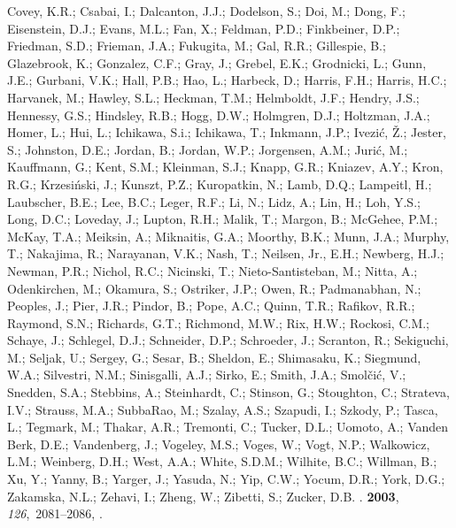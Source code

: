 \begin{thebibliography}{-------}
  {Covey}, K.R.; {Csabai}, I.; {Dalcanton}, J.J.; {Dodelson}, S.; {Doi}, M.;
  {Dong}, F.; {Eisenstein}, D.J.; {Evans}, M.L.; {Fan}, X.; {Feldman}, P.D.;
  {Finkbeiner}, D.P.; {Friedman}, S.D.; {Frieman}, J.A.; {Fukugita}, M.; {Gal},
  R.R.; {Gillespie}, B.; {Glazebrook}, K.; {Gonzalez}, C.F.; {Gray}, J.;
  {Grebel}, E.K.; {Grodnicki}, L.; {Gunn}, J.E.; {Gurbani}, V.K.; {Hall}, P.B.;
  {Hao}, L.; {Harbeck}, D.; {Harris}, F.H.; {Harris}, H.C.; {Harvanek}, M.;
  {Hawley}, S.L.; {Heckman}, T.M.; {Helmboldt}, J.F.; {Hendry}, J.S.;
  {Hennessy}, G.S.; {Hindsley}, R.B.; {Hogg}, D.W.; {Holmgren}, D.J.;
  {Holtzman}, J.A.; {Homer}, L.; {Hui}, L.; {Ichikawa}, S.i.; {Ichikawa}, T.;
  {Inkmann}, J.P.; {Ivezi{\'c}}, {\v Z}.; {Jester}, S.; {Johnston}, D.E.;
  {Jordan}, B.; {Jordan}, W.P.; {Jorgensen}, A.M.; {Juri{\'c}}, M.;
  {Kauffmann}, G.; {Kent}, S.M.; {Kleinman}, S.J.; {Knapp}, G.R.; {Kniazev},
  A.Y.; {Kron}, R.G.; {Krzesi{\'n}ski}, J.; {Kunszt}, P.Z.; {Kuropatkin}, N.;
  {Lamb}, D.Q.; {Lampeitl}, H.; {Laubscher}, B.E.; {Lee}, B.C.; {Leger}, R.F.;
  {Li}, N.; {Lidz}, A.; {Lin}, H.; {Loh}, Y.S.; {Long}, D.C.; {Loveday}, J.;
  {Lupton}, R.H.; {Malik}, T.; {Margon}, B.; {McGehee}, P.M.; {McKay}, T.A.;
  {Meiksin}, A.; {Miknaitis}, G.A.; {Moorthy}, B.K.; {Munn}, J.A.; {Murphy},
  T.; {Nakajima}, R.; {Narayanan}, V.K.; {Nash}, T.; {Neilsen}, Jr., E.H.;
  {Newberg}, H.J.; {Newman}, P.R.; {Nichol}, R.C.; {Nicinski}, T.;
  {Nieto-Santisteban}, M.; {Nitta}, A.; {Odenkirchen}, M.; {Okamura}, S.;
  {Ostriker}, J.P.; {Owen}, R.; {Padmanabhan}, N.; {Peoples}, J.; {Pier}, J.R.;
  {Pindor}, B.; {Pope}, A.C.; {Quinn}, T.R.; {Rafikov}, R.R.; {Raymond}, S.N.;
  {Richards}, G.T.; {Richmond}, M.W.; {Rix}, H.W.; {Rockosi}, C.M.; {Schaye},
  J.; {Schlegel}, D.J.; {Schneider}, D.P.; {Schroeder}, J.; {Scranton}, R.;
  {Sekiguchi}, M.; {Seljak}, U.; {Sergey}, G.; {Sesar}, B.; {Sheldon}, E.;
  {Shimasaku}, K.; {Siegmund}, W.A.; {Silvestri}, N.M.; {Sinisgalli}, A.J.;
  {Sirko}, E.; {Smith}, J.A.; {Smol{\v c}i{\'c}}, V.; {Snedden}, S.A.;
  {Stebbins}, A.; {Steinhardt}, C.; {Stinson}, G.; {Stoughton}, C.; {Strateva},
  I.V.; {Strauss}, M.A.; {SubbaRao}, M.; {Szalay}, A.S.; {Szapudi}, I.;
  {Szkody}, P.; {Tasca}, L.; {Tegmark}, M.; {Thakar}, A.R.; {Tremonti}, C.;
  {Tucker}, D.L.; {Uomoto}, A.; {Vanden Berk}, D.E.; {Vandenberg}, J.;
  {Vogeley}, M.S.; {Voges}, W.; {Vogt}, N.P.; {Walkowicz}, L.M.; {Weinberg},
  D.H.; {West}, A.A.; {White}, S.D.M.; {Wilhite}, B.C.; {Willman}, B.; {Xu},
  Y.; {Yanny}, B.; {Yarger}, J.; {Yasuda}, N.; {Yip}, C.W.; {Yocum}, D.R.;
  {York}, D.G.; {Zakamska}, N.L.; {Zehavi}, I.; {Zheng}, W.; {Zibetti}, S.;
  {Zucker}, D.B.
.
 {\bf 2003}, {\em 126},~2081--2086,
  \href{http://xxx.lanl.gov/abs/astro-ph/0305492}{{\normalfont
  [astro-ph/0305492]}}.


\end{thebibliography}

